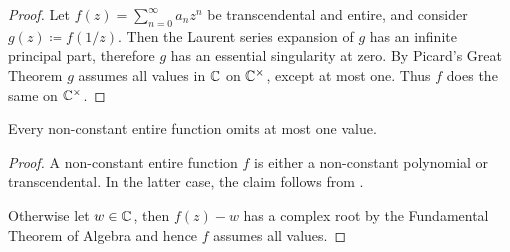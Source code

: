 \begin{proof}
    Let $f(z) = \sum_{n=0}^\infty a_n z^n$ be transcendental and entire, and consider $g(z) \coloneqq f(1 / z)$. Then the Laurent series expansion of $g$ has an infinite principal part, therefore $g$ has an essential singularity at zero. By Picard's Great Theorem $g$ assumes all values in $\mathbb{C}$ on $\mathbb{C}^\times$, except at most one. Thus $f$ does the same on $\mathbb{C}^\times$.
\end{proof}

\begin{corollary} \label{thm:picards-little-theorem}
    Every non-constant entire function omits at most one value.
\end{corollary}

\begin{proof}
    A non-constant entire function $f$ is either a non-constant polynomial or transcendental. In the latter case, the claim follows from .
    
    Otherwise let $w \in \mathbb{C}$, then $f(z) - w$ has a complex root by the Fundamental Theorem of Algebra and hence $f$ assumes all values.
\end{proof}